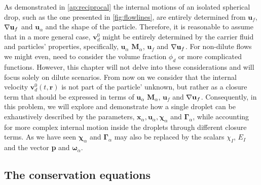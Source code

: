 As demonstrated in \ref{ap:reciprocal} the internal motions of an isolated spherical drop, such as the one presented in  \ref{fig:flowlines}, are entirely determined  from $\textbf{u}_f$,$\mathbf{\nabla}\textbf{u}_f$ and $\textbf{u}_\alpha$ and the shape of the particle. 
Therefore, it is reasonable to assume that in a more general case, $\textbf{v}_d^0$ might be entirely determined by the carrier fluid and particles' properties, specifically, $\textbf{u}_\alpha$ $\textbf{M}_\alpha$, $\textbf{u}_f$ and $\mathbf{\nabla}\textbf{u}_f$. 
For non-dilute flows we might even, need to consider the volume fraction $\phi_d$ or more complicated functions.
However, this chapter will not delve into these considerations and will focus solely on dilute scenarios.
From now on we consider that the internal velocity $\textbf{v}^0_d(t,\textbf{r})$ is not part of the particle' unknown, but rather as a closure term that should be expressed in terms of $\textbf{u}_\alpha$ $\textbf{M}_\alpha$, $\textbf{u}_f$ and $\mathbf{\nabla}\textbf{u}_f$. 
Consequently, in this problem, we will explore and demonstrate how a single droplet can be exhaustively described by the parameters, $\textbf{x}_\alpha, \textbf{u}_\alpha, \bm\chi_\alpha$ and $\bm\Gamma_\alpha$, while accounting for more complex internal motion inside the droplets through different closure terms.
As we have seen $\bm\chi_\alpha$ and $\bm\Gamma_\alpha$ may also be replaced by the scalars $\chi_I$, $E_I$ and the vector \textbf{p} and $\bm\omega_\alpha$. 

\subsection{The conservation equations}

